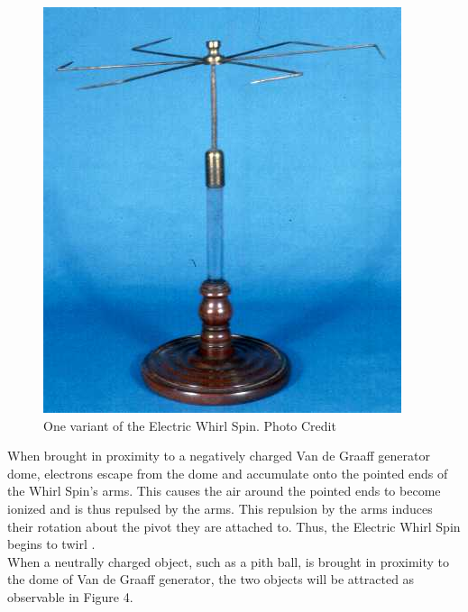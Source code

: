 \documentclass[oneside,12pt]{amsart}
\begin{document}
\begin{figure}[h]
	\includegraphics[width=\smallgraph,scale=0.01]{Whirl.png}
	\caption{One variant of the Electric Whirl Spin. Photo Credit \cite{greenslade}}
	\label{Whirl}
\end{figure}

\indent When brought in proximity to a negatively charged Van de Graaff generator dome, electrons escape from the dome and accumulate onto the pointed ends of the Whirl Spin’s arms. This causes the air around the pointed ends to become ionized and is thus repulsed by the arms. This repulsion by the arms induces their rotation about the pivot they are attached to. Thus, the Electric Whirl Spin begins to twirl \cite{davis_2012}. \\

\indent When a neutrally charged object, such as a pith ball, is brought in proximity to the dome of  Van de Graaff generator, the two objects will be attracted as observable in Figure 4.\\
\end{document}
